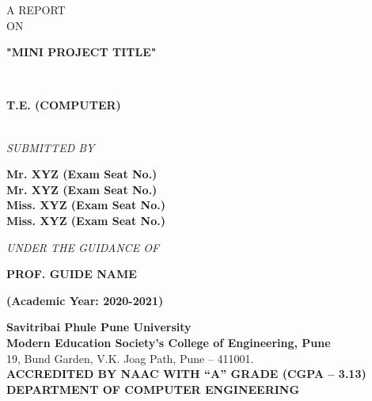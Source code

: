 \documentclass[a4paper, 12pt]{report}
\begin{document}
\begin{frontmatter}
\begin{titlepage}
\begin{center}
        \textup{\large  A REPORT\\[0.4cm]ON}\\[0.4cm]
        \begin{LARGE}
            {\textbf {"MINI PROJECT TITLE" }}\end{LARGE}\\[1cm]
        \begin{large}\textbf {T.E. (COMPUTER)}
        \end{large}\\[0.5cm]
        \textit{SUBMITTED BY}\\[0.3cm]
        \begin{large}
            \textbf{Mr. XYZ (Exam Seat No.)}\\[0.1cm]
            \textbf{Mr. XYZ (Exam Seat No.)}\\[0.1cm]
            \textbf{Miss. XYZ (Exam Seat No.)}\\[0.1cm]
            \textbf{Miss. XYZ (Exam Seat No.)}\\[0.5cm]
        \end{large}
        \textit{UNDER THE GUIDANCE OF}\\[0.7cm]
        \begin{large}\textbf{PROF. GUIDE NAME}\\[0.3cm]\end{large}
        \textbf{(Academic Year: 2020-2021)}
        \vfill
    \end{center}
\end{titlepage}

\begin{titlepage}
    \begin{center}
        \textup{\large  \textbf{Savitribai Phule Pune University}\\
            \textbf{Modern Education Society’s College of Engineering, Pune}}\\
        19, Bund Garden, V.K. Joag Path, Pune – 411001.\\[0.5cm]
        \textbf{ACCREDITED BY NAAC WITH “A” GRADE (CGPA – 3.13)}\\[0.5cm]
        \textbf{\large DEPARTMENT OF COMPUTER ENGINEERING}


\end{center}
\end{titlepage}
\end{frontmatter}
\end{document}
